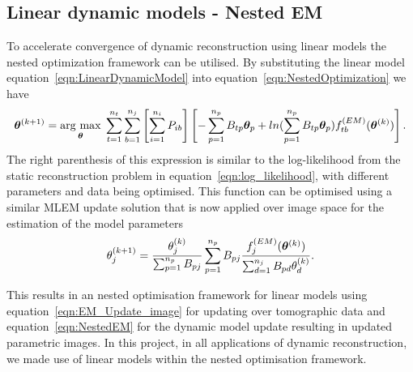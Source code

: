 \subsection{Linear dynamic models - Nested EM}
To accelerate convergence of dynamic reconstruction using linear models the nested optimization framework can be utilised. By substituting the linear model equation~\ref{eqn:LinearDynamicModel} into equation~\ref{eqn:NestedOptimization} we have
\begin{equation}
\bm{\theta}^{(k+1)} = 
\underset{\bm{\theta}}{\operatorname{arg}\,\operatorname{max}}\;
\sum_{t=1}^{n_t} \sum_{b=1}^{n_j} \left[ \sum_{i=1}^{n_i}  P_{ib} \right]
\left[ 
-\sum_{p=1}^{n_p} B_{tp} \bm\theta_{p} + 
ln( \sum_{p=1}^{n_p} B_{tp} \bm\theta_{p}) 
f_{tb}^{(EM)}(\bm{\theta}^{(k)})
\right] \\ .
\end{equation}
The right parenthesis of this expression is similar to the log-likelihood from the static reconstruction problem in equation~\ref{eqn:log_likelihood}, with different parameters and data being optimised. This function can be optimised using a similar MLEM update solution that is now applied over image space for the estimation of the model parameters 
\begin{equation}
\theta_j^{(k+1)} = \frac{\theta_j^{(k)}}
{\sum_{p=1}^{n_p} B_{pj}} 
\sum_{p=1}^{n_p} B_{pj} 
\frac{f_{j}^{(EM)}(\bm{\theta}^{(k)})}{\sum_{d=1}^{n_j} B_{pd}\theta_d^{(k)} } \\.
\label{eqn:NestedEM}
\end{equation}

This results in an nested optimisation framework for linear models using equation~\ref{eqn:EM_Update_image} for updating over tomographic data and equation~\ref{eqn:NestedEM} for the dynamic model update resulting in updated parametric images. 
In this project, in all applications of dynamic reconstruction, we made use of linear models within the nested optimisation framework.
